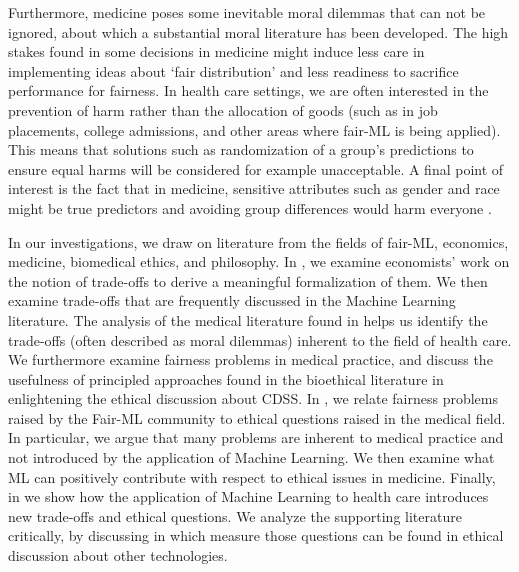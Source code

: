 Furthermore, medicine poses some inevitable moral dilemmas that can not be ignored, about which a substantial moral literature has been developed.
The high stakes found in some decisions in medicine might induce less care in implementing ideas about `fair distribution' and less readiness to sacrifice performance for fairness.
In health care settings, we are often interested in the prevention of harm rather than the allocation of goods (such as in job placements, college admissions, and other areas where fair-ML is being applied).
This means that solutions such as randomization of a group's predictions to ensure equal harms will be considered for example unacceptable.
A final point of interest is the fact that in medicine, sensitive attributes such as gender and race might be true predictors and avoiding group differences would harm everyone \cite{Mccradden2020}.



In our investigations, we draw on literature from the fields of fair-ML, economics, medicine, biomedical ethics, and philosophy.
In , we examine economists' work on the notion of trade-offs to derive a meaningful formalization of them.
We then examine trade-offs that are frequently discussed in the Machine Learning literature.
The analysis of the medical literature found in  helps us identify the trade-offs (often described as moral dilemmas) inherent to the field of health care.
We furthermore examine fairness problems in medical practice, and discuss the usefulness of principled approaches found in the bioethical literature in enlightening the ethical discussion about CDSS.
In , we relate fairness problems raised by the Fair-ML community to ethical questions raised in the medical field.
In particular, we argue that many problems are inherent to medical practice and not introduced by the application of Machine Learning.
We then examine what ML can positively contribute with respect to ethical issues in medicine.
Finally, in  we show how the application of Machine Learning to health care introduces new trade-offs and ethical questions.
We analyze the supporting literature critically, by discussing in which measure those questions can be found in ethical discussion about other technologies.

